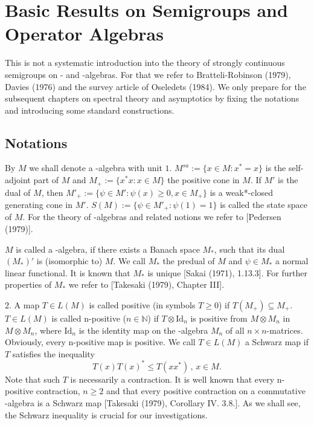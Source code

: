 
\chapter{Basic Results on Semigroups and Operator Algebras}\label{chap:D-I}

This is not a systematic introduction into the theory of strongly continuous semigroups on \CA- and \WA-algebras.
For that we refer to Bratteli-Robinson (1979), Davies (1976) and the survey article of Oseledets (1984).
We only prepare for the subsequent chapters on spectral theory and asymptotics by fixing the notations and introducing some standard constructions.

\section{Notations}\label{sec:notations}

By $ M $ we shall denote a \CA-algebra with unit $ 1 $.
$ M^{sa} := \{x \in M : x^* = x\} $ is the self-adjoint part of $ M $ and $ M_{+} := \{ x^*x : x \in M\} $ the positive cone in $ M $.
If $ M' $ is the dual of $ M $, then $ M'_{+} := \{\psi \in M' : \psi(x) \geq 0, x \in M_{+}\} $ is a weak*-closed generating cone in $ M' $.
$ S(M) := \{\psi \in M'_{+}: \psi(1) = 1\} $ is called the state space of $ M $.
For the theory of \CA-algebras and related notions we refer to [Pedersen (1979)].

$ M $ is called a \WA-algebra, if there exists a Banach space $ M_{*} $, such that its dual $ (M_{*})' $ is (isomorphic to) $ M $.
We call $ M_{*} $ the predual of $ M $ and $ \psi \in M_{*} $ a normal linear functional.
It is known that $ M_{*} $ is unique [Sakai (1971), 1.13.3].
For further properties of $ M_{*} $ we refer to [Takesaki (1979), Chapter III].

2. A map $ T \in L(M) $ is called positive (in symbols $ T \geq 0 $) if $ T(M_{+}) \subseteq M_{+} $.
$ T \in L(M) $ is called n-positive ($ n \in \mathbb{N} $) if $ T \otimes \text{Id}_n $ is positive from $ M \otimes M_n $ in $ M \otimes M_n $, where $ \text{Id}_n $ is the identity map on the \CA-algebra $ M_n $ of all $ n \times n $-matrices.
Obviously, every n-positive map is positive.
We call $ T \in L(M) $ a Schwarz map if $ T $ satisfies the inequality
\[
T(x)T(x)^* \leq T(xx^*) \, , \, x \in M .
\]
Note that such $ T $ is necessarily a contraction.
It is well known that every n-positive contraction, $ n \geq 2 $ and that every positive contraction on a commutative \CA-algebra is a Schwarz map [Takesaki (1979), Corollary IV. 3.8.].
As we shall see, the Schwarz inequality is crucial for our investigations.

